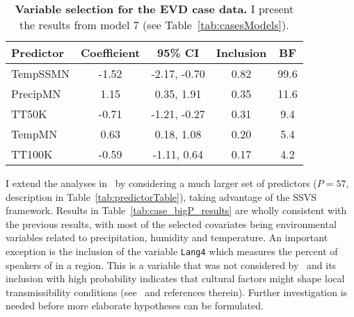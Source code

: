 \begin{minipage}{\textwidth}    
\setcounter{mpfootnote}{\value{footnote}}
\renewcommand{\thempfootnote}{\arabic{mpfootnote}}
\fontsize{9}{11}\selectfont
{}
\begin{longtable}{lcccc}
\caption[Variable selection for the EVD case data.]{\textbf{Variable selection for the EVD case data.}
I present the results from model 7 (see Table~\ref{tab:casesModels}).
}
\label{tab:case_glm_results}\\
\toprule
Predictor\footnotemark[1] & Coefficient\footnotemark[2] & 95\% CI\footnotemark[3] & Inclusion\footnotemark[4] & BF\footnotemark[5] \\
\toprule
TempSSMN & -1.52 & -2.17, -0.70 & 0.82 & 99.6 \\
\hline
PrecipMN & 1.15 & 0.35, 1.91 & 0.35 & 11.6 \\
\hline
TT50K &  -0.71 & -1.21, -0.27 & 0.31 & 9.4 \\
\hline
TempMN &  0.63 & 0.18, 1.08 & 0.20 & 5.4 \\
\hline
TT100K & -0.59 & -1.11, 0.64 & 0.17 & 4.2\\
\bottomrule
\end{longtable}
\setcounter{footnote}{\value{mpfootnote}}
\end{minipage}

I extend the analyses in~\cite{Dudas2017} by considering a much larger set of predictors ($P = 57$, description in Table~\ref{tab:predictorTable}), taking advantage of the SSVS framework.
Results in Table~\ref{tab:case_bigP_results} are wholly consistent with the previous results, with most of the selected covariates being environmental variables related to precipitation, humidity and temperature.
An important exception is the inclusion of the variable \verb|Lang4| which measures the percent of speakers of { \color{red}{SOME LANGUAGE} } in a region.
This is a variable that was not considered by~\cite{Dudas2017} and its inclusion with high probability indicates that cultural factors might shape local transmissibility conditions (see~\cite{Alexander2015} and references therein).
Further investigation is needed before more elaborate hypotheses can be formulated.

